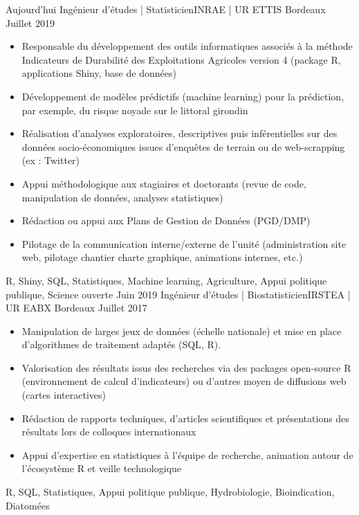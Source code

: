 \documentclass[localFont,alternative]{yaac-another-awesome-cv}
\begin{document}
\begin{experiences}
\experience
    {Aujourd'hui}   {Ingénieur d'études | Statisticien}{INRAE | UR ETTIS }{Bordeaux}
    {Juillet 2019} {
                      \begin{itemize}                    
                        \item Responsable du développement des outils informatiques associés à la méthode Indicateurs de Durabilité des Exploitations Agricoles version 4 (package R, applications Shiny, base de données)
                        \item Développement de modèles prédictifs (machine learning) pour la prédiction, par exemple, du risque noyade sur le littoral girondin
                        \item Réalisation d'analyses exploratoires, descriptives puis inférentielles sur des données socio-économiques issues d'enquêtes de terrain ou de web-scrapping (ex : Twitter)
                        \item Appui méthodologique aux stagiaires et doctorants (revue de code, manipulation de données, analyses statistiques)
                        \item Rédaction ou appui aux Plans de Gestion de Données (PGD/DMP)
                        \item Pilotage de la communication interne/externe de l'unité (administration site web, pilotage chantier charte graphique, animations internes, etc.)
                      \end{itemize}
                    }
                    {R, Shiny, SQL, Statistiques, Machine learning, Agriculture, Appui politique publique, Science ouverte}
  \emptySeparator
  \emptySeparator
  \experience
    {Juin 2019}   {Ingénieur d'études | Biostatisticien}{IRSTEA | UR EABX }{Bordeaux}
    {Juillet 2017} {
                      \begin{itemize}                    
                        \item Manipulation de larges jeux de données (échelle nationale) et mise en place d'algorithmes de traitement adaptés (SQL, R).
                        \item Valorisation des résultats issus des recherches via des packages open-source R (environnement de calcul d'indicateurs) ou d'autres moyen de diffusions web (cartes interactives)
                        \item Rédaction de rapports techniques, d'articles scientifiques et présentations des résultats lors de colloques internationaux
                        \item Appui d'expertise en statistiques à l'équipe de recherche, animation autour de l'écosystème R et veille technologique                                                                         
                      \end{itemize}
                    }
                    {R, SQL, Statistiques, Appui politique publique, Hydrobiologie, Bioindication, Diatomées}
   
\end{experiences}
\end{document}

